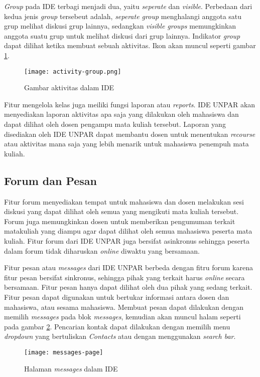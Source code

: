 \textit{Group} pada IDE terbagi menjadi dua, yaitu \textit{seperate} dan \textit{visible}. Perbedaan dari kedua jenis \textit{group} tersebeut adalah, \textit{seperate group} menghalangi anggota satu grup melihat diskusi grup lainnya, sedangkan \textit{visible groups} memungkinkan anggota suatu grup untuk melihat diskusi dari grup lainnya. Indikator \textit{group} dapat dilihat ketika membuat sebuah aktivitas. Ikon akan muncul seperti gambar \ref{fig:groups}.

\begin{figure} 
	\centering  
	\texttt{[image: activity-group.png]}  
	\caption[Gambar aktivitas dalam IDE] {Gambar aktivitas dalam IDE\cite{IDE:dasar-dasar}} 
	\label{fig:groups} 
\end{figure} 
Fitur mengelola kelas juga meiliki fungsi laporan atau \textit{reports}. IDE UNPAR akan menyediakan laporan aktivitas apa saja yang dilakukan oleh mahasiswa dan dapat dilihat oleh dosen pengampu mata kuliah tersebut. Laporan yang disediakan oleh IDE UNPAR dapat membantu dosen untuk menentukan \textit{recourse} atau aktivitas mana saja yang lebih menarik untuk mahasiswa penempuh mata kuliah.

\subsection{Forum dan Pesan}
Fitur forum menyediakan tempat untuk mahasiswa dan dosen melakukan sesi diskusi yang dapat dilihat oleh semua yang mengikuti mata kuliah tersebut. Forum juga memungkinkan dosen untuk memberikan pengumuman terkait matakuliah yang diampu agar dapat dilihat oleh semua mahasiswa peserta mata kuliah. Fitur forum dari IDE UNPAR juga bersifat asinkronus sehingga peserta dalam forum tidak diharuskan \textit{online} diwaktu yang bersamaan.

Fitur pesan atau \textit{messages} dari IDE UNPAR berbeda dengan fitru forum karena fitur pesan bersifat sinkronus, sehingga pihak yang terkait harus \textit{online} secara bersamaan. Fitur pesan hanya dapat dilihat oleh dua pihak yang sedang terkait. Fitur pesan dapat digunakan untuk bertukar informasi antara dosen dan mahasiswa, atau sesama mahasiswa. Membuat pesan dapat dilakukan dengan memilih \textit{messages} pada blok \textit{messages}, kemudian akan muncul halam seperti pada gambar \ref{fig:messages}. Pencarian kontak dapat dilakukan dengan memilih menu \textit{dropdown} yang bertuliskan \textit{Contacts} atau dengan menggunakan \textit{search bar}.
\begin{figure} [H]
	\centering  
	\texttt{[image: messages-page]}  
	\caption[Halaman \textit{messages} dalam IDE] {Halaman \textit{messages} dalam IDE\cite{IDE:dasar-dasar}}
	\label{fig:messages} 
\end{figure} 
   

